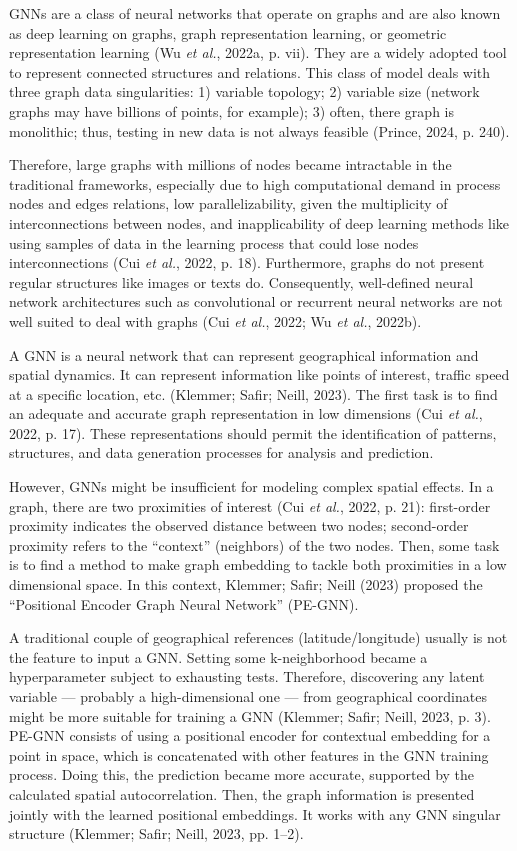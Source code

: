 \documentclass[12pt, a4paper, twoside]{article}
\numberwithin{equation}{subsection} %
\begin{document}
GNNs are a class of neural networks that operate on graphs and are also
known as deep learning on graphs, graph representation learning, or
geometric representation learning (Wu \emph{et al.}, 2022a, p. vii).
They are a widely adopted tool to represent connected structures and
relations. This class of model deals with three graph data
singularities: 1) variable topology; 2) variable size (network graphs
may have billions of points, for example); 3) often, there graph is
monolithic; thus, testing in new data is not always feasible (Prince,
2024, p. 240).

Therefore, large graphs with millions of nodes became intractable in the
traditional frameworks, especially due to high computational demand in
process nodes and edges relations, low parallelizability, given the
multiplicity of interconnections between nodes, and inapplicability of
deep learning methods like using samples of data in the learning process
that could lose nodes interconnections (Cui \emph{et al.}, 2022, p. 18).
Furthermore, graphs do not present regular structures like images or
texts do. Consequently, well-defined neural network architectures such
as convolutional or recurrent neural networks are not well suited to
deal with graphs (Cui \emph{et al.}, 2022; Wu \emph{et al.}, 2022b).

A GNN is a neural network that can represent geographical information
and spatial dynamics. It can represent information like points of
interest, traffic speed at a specific location, etc. (Klemmer; Safir;
Neill, 2023). The first task is to find an adequate and accurate graph
representation in low dimensions (Cui \emph{et al.}, 2022, p. 17). These
representations should permit the identification of patterns,
structures, and data generation processes for analysis and prediction.

However, GNNs might be insufficient for modeling complex spatial
effects. In a graph, there are two proximities of interest (Cui \emph{et
al.}, 2022, p. 21): first-order proximity indicates the observed
distance between two nodes; second-order proximity refers to the
``context'' (neighbors) of the two nodes. Then, some task is to find a
method to make graph embedding to tackle both proximities in a low
dimensional space. In this context, Klemmer; Safir; Neill (2023)
proposed the ``Positional Encoder Graph Neural Network'' (PE-GNN).

A traditional couple of geographical references (latitude/longitude)
usually is not the feature to input a GNN. Setting some k-neighborhood
became a hyperparameter subject to exhausting tests. Therefore,
discovering any latent variable --- probably a high-dimensional one ---
from geographical coordinates might be more suitable for training a GNN
(Klemmer; Safir; Neill, 2023, p. 3). PE-GNN consists of using a
positional encoder for contextual embedding for a point in space, which
is concatenated with other features in the GNN training process. Doing
this, the prediction became more accurate, supported by the calculated
spatial autocorrelation. Then, the graph information is presented
jointly with the learned positional embeddings. It works with any GNN
singular structure (Klemmer; Safir; Neill, 2023, pp. 1--2).
\end{document}
